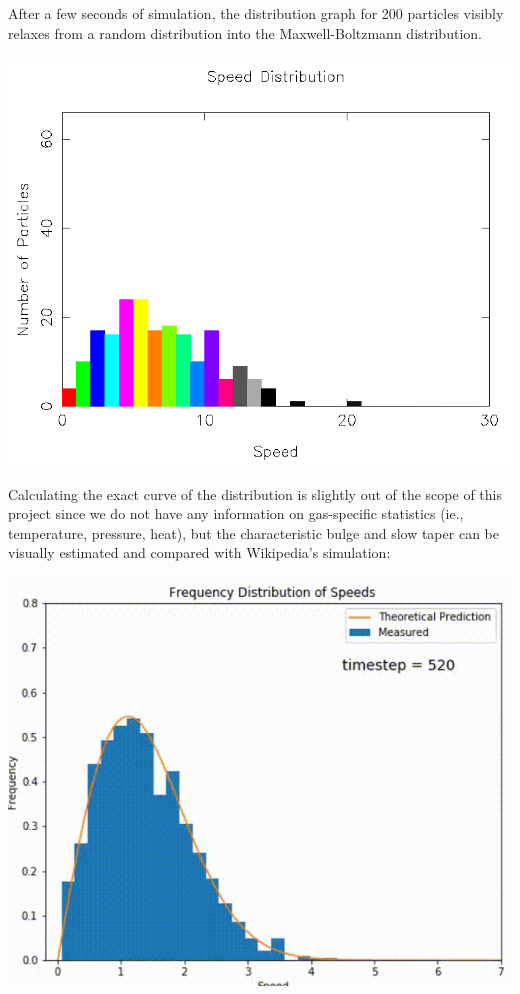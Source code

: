 \documentclass{article}
\begin{document}
After a few seconds of simulation, the distribution graph for 200 particles visibly relaxes from a random distribution
into the Maxwell-Boltzmann distribution.
\\
\begin{center}
    \includegraphics[scale=0.5]{uncharged_random_dist}
\end{center}

Calculating the exact curve of the distribution is slightly out of the scope of this project
since we do not have any information on gas-specific statistics (ie., temperature, pressure, heat),
but the characteristic bulge and slow taper can be visually estimated and compared with Wikipedia's simulation:
\\
\begin{center}
    \includegraphics[scale=0.5]{mb_wiki}
\end{center}
\end{document}
